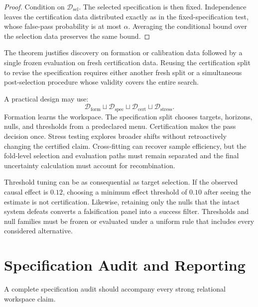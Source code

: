 \begin{proof}
Condition on \(\mathcal D_{\mathrm{sel}}\). The selected specification is then
fixed. Independence leaves the certification data distributed exactly as in
the fixed-specification test, whose false-pass probability is at most
\(\alpha\). Averaging the conditional bound over the selection data preserves
the same bound.
\end{proof}

The theorem justifies discovery on formation or calibration data followed by a
single frozen evaluation on fresh certification data. Reusing the
certification split to revise the specification requires either another fresh
split or a simultaneous post-selection procedure whose validity covers the
entire search.


A practical design may use:
\[
\mathcal D_{\mathrm{form}}
\sqcup
\mathcal D_{\mathrm{spec}}
\sqcup
\mathcal D_{\mathrm{cert}}
\sqcup
\mathcal D_{\mathrm{stress}}.
\]
Formation learns the workspace. The specification split chooses targets,
horizons, nulls, and thresholds from a predeclared menu. Certification makes
the pass decision once. Stress testing explores broader shifts without
retroactively changing the certified claim. Cross-fitting can recover sample
efficiency, but the fold-level selection and evaluation paths must remain
separated and the final uncertainty calculation must account for recombination.


Threshold tuning can be as consequential as target selection. If the observed
causal effect is \(0.12\), choosing a minimum effect threshold of \(0.10\)
after seeing the estimate is not certification. Likewise, retaining only the
nulls that the intact system defeats converts a falsification panel into a
success filter. Thresholds and null families must be frozen or evaluated under
a uniform rule that includes every considered alternative.

\section{Specification Audit and Reporting}

A complete specification audit should accompany every strong relational
workspace claim.


